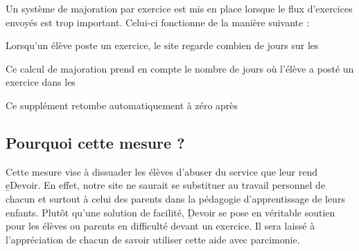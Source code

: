 ﻿Un système de majoration par exercice est mis en place lorsque le flux d'exercices envoyés est trop important. Celui-ci fonctionne de la manière suivante :
\item Lorsqu'un élève poste un exercice, le site regarde combien de jours sur les %
\item Ce calcul de majoration prend en compte le nombre de jours où l'élève a posté un exercice dans les %
\item Ce supplément retombe automatiquement à zéro après %

\subsection{Pourquoi cette mesure ?}

Cette mesure vise à dissuader les élèves d'abuser du service que leur rend \b{eDevoir}. En effet, notre site ne saurait se substituer au travail personnel de chacun et surtout à celui des parents dans la pédagogie d'apprentissage de leurs enfants. Plutôt qu'une solution de facilité, \b{Devoir} se pose en véritable soutien pour les élèves ou parents en difficulté devant un exercice.
Il sera laissé à l'appréciation de chacun de savoir utiliser cette aide avec parcimonie.